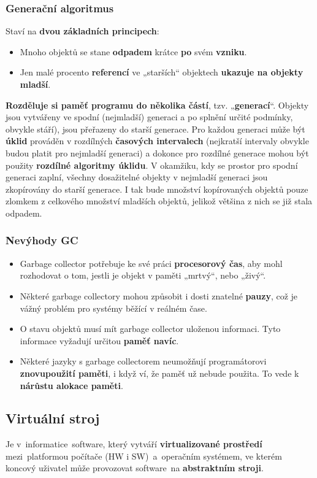\subsubsection{Generační algoritmus}
Staví na \textbf{dvou základních principech}:
\begin{itemize}
\item Mnoho objektů se stane \textbf{odpadem} krátce \textbf{po} svém \textbf{vzniku}.
\item Jen malé procento \textbf{referencí} ve „starších“ objektech \textbf{ukazuje na objekty mladší}.
\end{itemize}
\textbf{Rozděluje si paměť programu do několika částí}, tzv. „\textbf{generací}“. Objekty jsou vytvářeny ve spodní (nejmladší) generaci a po splnění určité podmínky, obvykle stáří), jsou přeřazeny do starší generace. Pro každou generaci může být \textbf{úklid} prováděn v rozdílných \textbf{časových intervalech }(nejkratší intervaly obvykle budou platit pro nejmladší generaci) a dokonce pro rozdílné generace mohou být použity \textbf{rozdílné algoritmy úklidu}. V okamžiku, kdy se prostor pro spodní generaci zaplní, všechny dosažitelné objekty v nejmladší generaci jsou zkopírovány do starší generace. I tak bude množství kopírovaných objektů pouze zlomkem z celkového množství mladších objektů, jelikož většina z nich se již stala odpadem.

\subsubsection{Nevýhody GC}
\begin{itemize}
\item Garbage collector potřebuje ke své práci \textbf{procesorový čas}, aby mohl rozhodovat o tom, jestli je objekt v paměti „mrtvý“, nebo „živý“.
\item Některé garbage collectory mohou způsobit i dosti znatelné \textbf{pauzy}, což je vážný problém pro systémy běžící v reálném čase.
\item O stavu objektů musí mít garbage collector uloženou informaci. Tyto informace vyžadují určitou \textbf{paměť navíc}.
\item Některé jazyky s garbage collectorem neumožňují programátorovi \textbf{znovupoužití paměti}, i když ví, že paměť už nebude použita. To vede k \textbf{nárůstu alokace paměti}.
\end{itemize}

\subsection{Virtuální stroj}
Je v informatice software, který vytváří \textbf{virtualizované prostředí} mezi platformou počítače (HW i SW) a operačním systémem, ve kterém koncový uživatel může provozovat software na \textbf{abstraktním stroji}.

